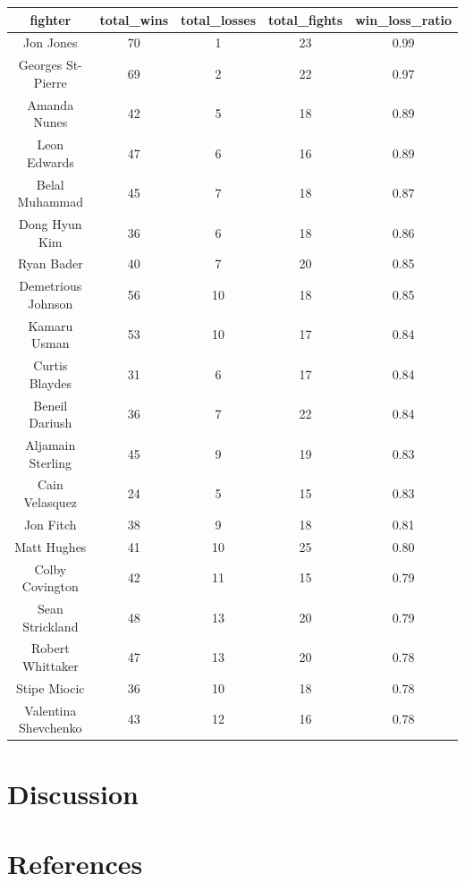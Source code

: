 \documentclass[
  man,floatsintext]{apa6}
\begin{document}
\begin{tabular}{c|c|c|c|c}
\hline
fighter & total\_wins & total\_losses & total\_fights & win\_loss\_ratio\\
\hline
Jon Jones & 70 & 1 & 23 & 0.99\\
\hline
Georges St-Pierre & 69 & 2 & 22 & 0.97\\
\hline
Amanda Nunes & 42 & 5 & 18 & 0.89\\
\hline
Leon Edwards & 47 & 6 & 16 & 0.89\\
\hline
Belal Muhammad & 45 & 7 & 18 & 0.87\\
\hline
Dong Hyun Kim & 36 & 6 & 18 & 0.86\\
\hline
Ryan Bader & 40 & 7 & 20 & 0.85\\
\hline
Demetrious Johnson & 56 & 10 & 18 & 0.85\\
\hline
Kamaru Usman & 53 & 10 & 17 & 0.84\\
\hline
Curtis Blaydes & 31 & 6 & 17 & 0.84\\
\hline
Beneil Dariush & 36 & 7 & 22 & 0.84\\
\hline
Aljamain Sterling & 45 & 9 & 19 & 0.83\\
\hline
Cain Velasquez & 24 & 5 & 15 & 0.83\\
\hline
Jon Fitch & 38 & 9 & 18 & 0.81\\
\hline
Matt Hughes & 41 & 10 & 25 & 0.80\\
\hline
Colby Covington & 42 & 11 & 15 & 0.79\\
\hline
Sean Strickland & 48 & 13 & 20 & 0.79\\
\hline
Robert Whittaker & 47 & 13 & 20 & 0.78\\
\hline
Stipe Miocic & 36 & 10 & 18 & 0.78\\
\hline
Valentina Shevchenko & 43 & 12 & 16 & 0.78\\
\hline
\end{tabular}

\hypertarget{discussion-1}{%
\section{Discussion}\label{discussion-1}}

\newpage

\hypertarget{references}{%
\section{References}\label{references}}
\end{document}
